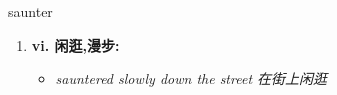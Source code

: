 
\begin{frame}
{\huge saunter}
\begin{center}
\begin{enumerate}\Large
  \item \textbf{vi. 闲逛,漫步:}
  \begin{itemize}
    \item \em{\Large{sauntered slowly down the street 在街上闲逛}}
  \end{itemize}
\end{enumerate}
\end{center}
\end{frame}
